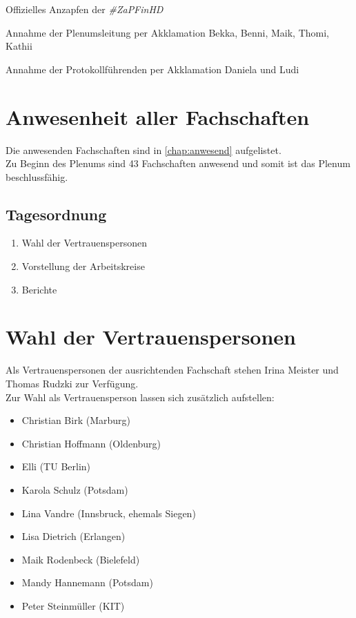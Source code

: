   Offizielles Anzapfen der \textit{\#ZaPFinHD}

  \begin{success}{Annahme der Plenumsleitung per Akklamation}
    Bekka, Benni, Maik, Thomi, Kathii
  \end{success}

  \begin{success}{Annahme der Protokollführenden per Akklamation}
    Daniela und Ludi
  \end{success}

\section{Anwesenheit aller Fachschaften}
  Die anwesenden Fachschaften sind in \autoref{chap:anwesend} aufgelistet. \\
  Zu Beginn des Plenums sind 43 Fachschaften anwesend und somit ist das Plenum beschlussfähig.

  \subsection{Tagesordnung}
    \begin{enumerate}
      \item Wahl der Vertrauenspersonen
      \item Vorstellung der Arbeitskreise
      \item Berichte
    \end{enumerate}

\section{Wahl der Vertrauenspersonen}

  Als Vertrauenspersonen der ausrichtenden Fachschaft stehen Irina Meister und Thomas Rudzki zur Verfügung. \\

  Zur Wahl als Vertrauensperson lassen sich zusätzlich aufstellen:
  \begin{itemize}
    \item Christian Birk (Marburg)
    \item Christian Hoffmann (Oldenburg)
    \item Elli (TU Berlin)
    \item Karola Schulz (Potsdam)
    \item Lina Vandre (Innsbruck, ehemals Siegen)
    \item Lisa Dietrich (Erlangen)
    \item Maik Rodenbeck (Bielefeld)
    \item Mandy Hannemann (Potsdam)
    \item Peter Steinmüller (KIT)
  \end{itemize}

